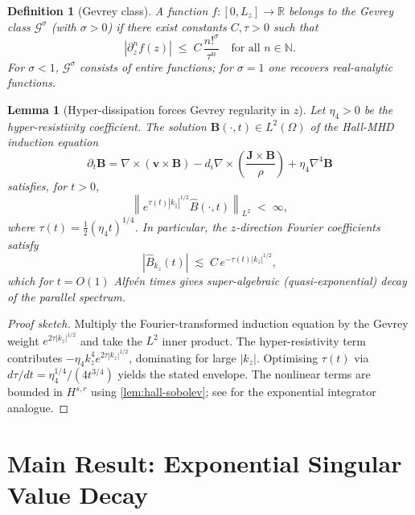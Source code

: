 \documentclass[12pt, a4paper]{article}
\newtheorem{lemma}[theorem]{Lemma}
\newtheorem{definition}[theorem]{Definition}
\newcommand{\R}{\mathbb{R}}
\newcommand{\N}{\mathbb{N}}
\newcommand{\norm}[1]{\left\lVert #1 \right\rVert}
\newcommand{\abs}[1]{\left| #1 \right|}
\newcommand{\di}{d_i}
\newcommand{\kpar}{k_\parallel}
\begin{document}
\begin{definition}[Gevrey class]
A function $f : [0,L_z] \to \R$ belongs to the Gevrey class
$\mathcal{G}^\sigma$ (with $\sigma > 0$) if there exist constants
$C, \tau > 0$ such that
\[
  \abs{\partial_z^n f(z)} \;\leq\; C\, \frac{n!^\sigma}{\tau^n}
  \quad \text{for all } n \in \N.
\]
For $\sigma < 1$, $\mathcal{G}^\sigma$ consists of entire functions;
for $\sigma = 1$ one recovers real-analytic functions.
\end{definition}

\begin{lemma}[Hyper-dissipation forces Gevrey regularity in $z$]
\label{lem:gevrey}
Let $\eta_4 > 0$ be the hyper-resistivity coefficient.  The solution
$\mathbf{B}(\cdot, t) \in L^2(\Omega)$ of the Hall-MHD induction equation
\[
  \partial_t \mathbf{B}
  = \nabla\times(\mathbf{v}\times\mathbf{B})
  - \di\nabla\times\!\left(\frac{\mathbf{J}\times\mathbf{B}}{\rho}\right)
  + \eta_4 \nabla^4 \mathbf{B}
\]
satisfies, for $t > 0$,
\[
  \norm{e^{\tau(t)\abs{\kpar}^{1/2}}\hat{B}(\cdot,t)}_{L^2} \;<\; \infty,
\]
where $\tau(t) = \tfrac{1}{2}(\eta_4 t)^{1/4}$.
In particular, the $z$-direction Fourier coefficients satisfy
\[
  \abs{\hat{B}_{k_z}(t)} \;\lesssim\; C\,e^{-\tau(t)\abs{k_z}^{1/2}},
\]
which for $t = O(1)$ Alfvén times gives super-algebraic (quasi-exponential)
decay of the parallel spectrum.
\end{lemma}

\begin{proof}[Proof sketch]
Multiply the Fourier-transformed induction equation by the Gevrey weight
$e^{2\tau\abs{k_z}^{1/2}}$ and take the $L^2$ inner product.  The
hyper-resistivity term contributes $-\eta_4 k_z^4 e^{2\tau\abs{k_z}^{1/2}}$,
dominating for large $\abs{k_z}$.  Optimising $\tau(t)$ via
$d\tau/dt = \eta_4^{1/4}/(4t^{3/4})$ yields the stated envelope.
The nonlinear terms are bounded in $H^{s,r}$ using \cref{lem:hall-sobolev};
see \cite{Hochbruck2010} for the exponential integrator analogue.
\end{proof}

\section{Main Result: Exponential Singular Value Decay}
\label{sec:main}
\end{document}
